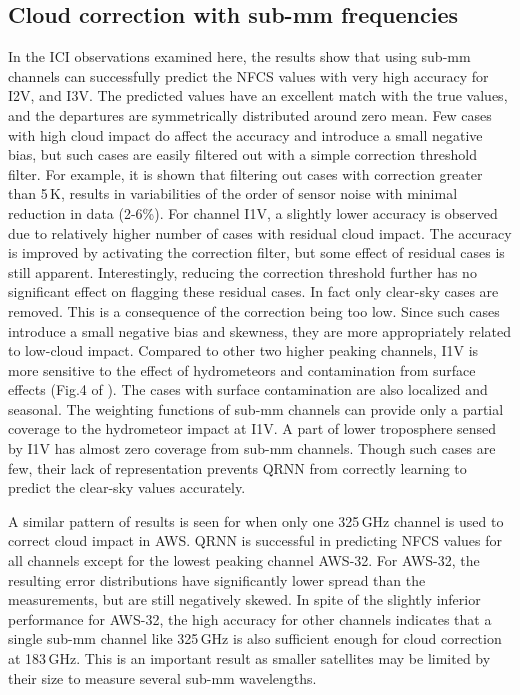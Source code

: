 \documentclass[amt, manuscript]{copernicus}
\begin{document}
\subsection{Cloud correction with sub-mm frequencies }
%
In the ICI observations examined here, the results show that using sub-mm channels can successfully predict the NFCS values with very high accuracy for I2V, and I3V. The predicted values have an excellent match with the true values, and the departures are symmetrically distributed around zero mean. Few cases with high cloud impact do affect the accuracy and introduce a small negative bias, but such cases are easily filtered out with a simple correction threshold filter. For example, it is shown that filtering out cases with correction greater than 5\,K, results in variabilities of the order of sensor noise with minimal reduction in data (2-6\%). For channel I1V, a slightly lower accuracy is observed due to relatively higher number of cases with residual cloud impact. The accuracy is improved by activating the correction filter, but some effect of residual cases is still apparent. Interestingly, reducing the correction threshold further has no significant effect on flagging these residual cases. In fact only clear-sky cases are removed. This is a consequence of the correction being too low. Since such cases introduce a small negative bias and skewness, they are more appropriately related to low-cloud impact. Compared to other two higher peaking channels, I1V is more sensitive to the effect of hydrometeors  and contamination from surface effects (Fig.4 of \citet{eriksson:towar:20}). The cases with surface contamination are also localized and seasonal. The weighting functions of sub-mm channels can provide only a partial coverage to the hydrometeor impact at I1V. A part of lower troposphere sensed by I1V has almost zero coverage from sub-mm channels. Though such cases are few, their lack of representation prevents QRNN from correctly learning to predict the clear-sky values accurately.

A similar pattern of results is seen for when only one 325\,GHz channel is used to correct cloud impact in AWS. QRNN is successful in predicting NFCS values for all channels except for the lowest peaking channel AWS-32. For AWS-32, the resulting error distributions have significantly lower spread than the measurements, but are still negatively skewed. In spite of the slightly inferior performance for AWS-32, the high accuracy for other channels indicates that a single sub-mm channel like 325\,GHz is also sufficient enough for cloud correction at 183\,GHz. This is an important result as smaller satellites may be limited by their size to measure several sub-mm wavelengths.
\end{document}
